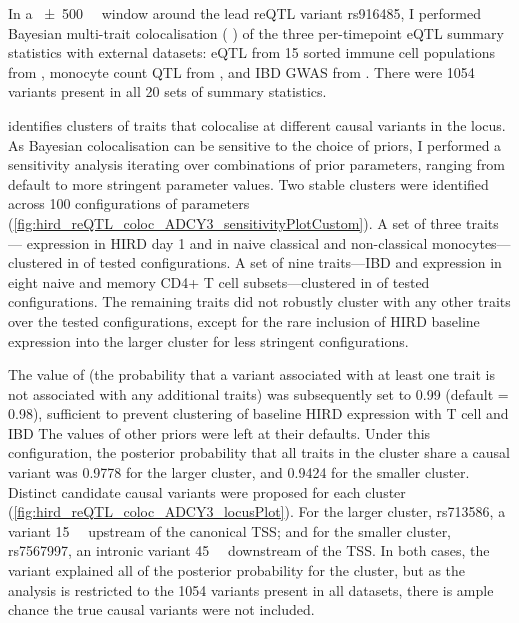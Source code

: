 In a \SI{\pm 500}{\mega\bp} window around the lead \gls{reQTL} variant rs916485,
I performed Bayesian multi-trait colocalisation ( \autocite{foley2019FastEfficientColocalization}) of
the three per-timepoint  \gls{eQTL} summary statistics with external datasets:
 \gls{eQTL} from 15 sorted immune cell populations from \textcite{schmiedel2018ImpactGeneticPolymorphisms},
monocyte count \gls{QTL} from \textcite{astle2016AllelicLandscapeHuman},
and \gls{IBD} \gls{GWAS} from \textcite{delange2017GenomewideAssociationStudy}.
There were 1054 variants present in all 20 sets of summary statistics.

 identifies clusters of traits that colocalise at different causal variants in the locus.
As Bayesian colocalisation can be sensitive to the choice of priors,
I performed a sensitivity analysis iterating over combinations of prior parameters, ranging from default to more stringent parameter values.
Two stable clusters were identified across 100 configurations of parameters (\cref{fig:hird_reQTL_coloc_ADCY3_sensitivityPlotCustom}).
A set of three traits--- expression in \gls{HIRD} day 1 and in naive classical and non-classical monocytes---clustered in  of tested configurations.
A set of nine traits---\gls{IBD} and expression in eight naive and memory CD4+ T cell subsets---clustered in  of tested configurations.
The remaining traits did not robustly cluster with any other traits over the tested configurations,
except for the rare inclusion of \gls{HIRD} baseline  expression into the larger cluster for less stringent configurations.

%
%
%
%
The value of  (the probability that a variant associated with at least one trait is not associated with any additional traits) was subsequently set to 0.99 (default = 0.98), 
sufficient to prevent clustering of baseline \gls{HIRD} expression with T cell and \gls{IBD}
The values of other priors were left at their defaults.
Under this configuration, the posterior probability that all traits in the cluster share a causal variant was \num{0.9778} for the larger cluster, 
and \num{0.9424} for the smaller cluster.
Distinct candidate causal variants were proposed for each cluster (\cref{fig:hird_reQTL_coloc_ADCY3_locusPlot}).
For the larger cluster, rs713586, a variant \SI{15}{\kilo\bp} upstream of the canonical  \gls{TSS};
and for the smaller cluster, rs7567997, an intronic variant \SI{45}{\kilo\bp} downstream of the \gls{TSS}.
In both cases, the variant explained all of the posterior probability for the cluster, 
but as the analysis is restricted to the 1054 variants present in all datasets, there is ample chance the true causal variants were not included.

